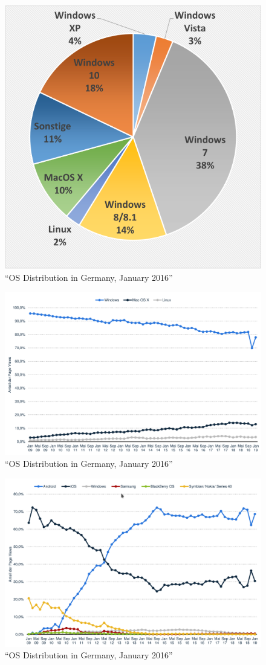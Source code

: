 \documentclass[
]{article}
\begin{document}
  \begin{figure}[h]
  \centering
  \includegraphics{../images/os_dist_g_2016.png}
  \caption{``OS Distribution in Germany, January 2016''}
  \end{figure}

  \begin{figure}[h]
  \centering
  \includegraphics{../images/os_dist_d_2009-2019.png}
  \caption{``OS Distribution in Germany, January 2016''}
  \end{figure}


  \begin{figure}[h]
  \centering
  \includegraphics{../images/os_dist_m_2009-2019.png}
  \caption{``OS Distribution in Germany, January 2016''}
  \end{figure}
\end{document}
